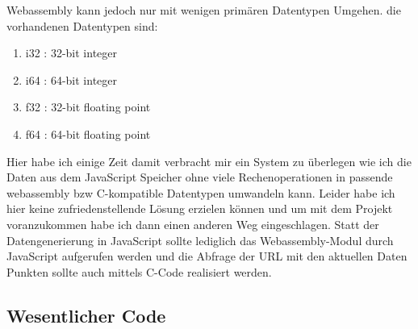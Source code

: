 Webassembly kann jedoch nur  mit wenigen primären Datentypen Umgehen. die vorhandenen Datentypen sind: \\
\begin{enumerate}
        \item i32 : 32-bit integer
        \item i64 : 64-bit integer
        \item f32 : 32-bit floating point
        \item f64 : 64-bit floating point
\end{enumerate}
\begin{verbatim*}

\end{verbatim*}
Hier habe ich einige Zeit damit verbracht mir ein System zu überlegen wie ich die Daten aus dem JavaScript Speicher  ohne viele Rechenoperationen in passende webassembly bzw C-kompatible Datentypen umwandeln kann. Leider habe ich hier keine zufriedenstellende Lösung erzielen können und um mit dem Projekt voranzukommen habe ich dann einen anderen Weg eingeschlagen.  Statt der Datengenerierung  in JavaScript sollte lediglich das Webassembly-Modul durch JavaScript aufgerufen werden und die Abfrage der URL mit den aktuellen Daten Punkten sollte auch mittels C-Code realisiert werden. \\

\subsection{Wesentlicher Code}
